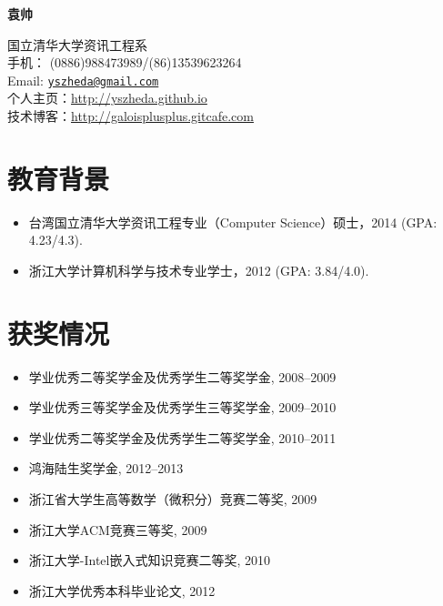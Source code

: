 \documentclass[letterpaper]{article}
\def\name{袁帅}
\begin{document}
\centerline{\huge\bf \name} \vspace{0.25in}
\begin{minipage}[t]{0.8\textwidth}
国立清华大学资讯工程系 \\
手机： (0886)988473989/(86)13539623264   \\
Email: \href{mailto:yszheda@gmail.com}{\tt yszheda@gmail.com}\\
个人主页：\url{http://yszheda.github.io} \\
技术博客：\url{http://galoisplusplus.gitcafe.com}
\end{minipage}

\section*{教育背景}
\begin{itemize}
\item 台湾国立清华大学资讯工程专业（Computer Science）硕士，2014 (GPA: 4.23/4.3).
\item 浙江大学计算机科学与技术专业学士，2012 (GPA: 3.84/4.0).
\end{itemize}

\section*{获奖情况}
\begin{itemize}
  \item 学业优秀二等奖学金及优秀学生二等奖学金, 2008--2009
  \item 学业优秀三等奖学金及优秀学生三等奖学金, 2009--2010
  \item 学业优秀二等奖学金及优秀学生二等奖学金, 2010--2011
  \item 鸿海陆生奖学金, 2012--2013				
  \item 浙江省大学生高等数学（微积分）竞赛二等奖, 2009
  \item 浙江大学ACM竞赛三等奖, 2009
  \item 浙江大学-Intel嵌入式知识竞赛二等奖, 2010
  \item 浙江大学优秀本科毕业论文, 2012
\end{itemize}
\end{document}
